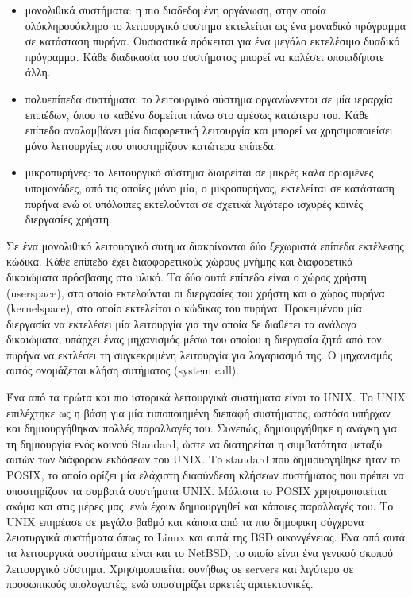 \begin{itemize}
	\item μονολιθικά συστήματα: η πιο διαδεδομένη οργάνωση, στην οποία
		ολόκληρουόκληρο το λειτουργικό συστημα εκτελείται ως ένα
		μοναδικό πρόγραμμα σε κατάσταση πυρήνα. Ουσιαστικά πρόκειται για
		ένα μεγάλο εκτελέσιμο δυαδικό πρόγραμμα. Κάθε διαδικασία του
		συστήματος μπορεί να καλέσει οποιαδήποτε άλλη. 
	\item πολυεπίπεδα συστήματα: το λειτουργικό σύστημα οργανώνενται σε μία
		ιεραρχία επιπέδων, όπου το καθένα δομείται πάνω στο αμέσως
		κατώτερο του. Κάθε επίπεδο αναλαμβάνει μία διαφορετική
		λειτουργία και μπορεί να χρησιμοποιείσει μόνο λειτουργίες που
		υποστηρίζουν κατώτερα επίπεδα.
	\item μικροπυρήνες: το λειτουργικό σύστημα διαιρείται σε μικρές καλά
		ορισμένες υπομονάδες, από τις οποίες μόνο μία, ο μικροπυρήνας,
		εκτελείται σε κατάσταση πυρήνα ενώ οι υπόλοιπες εκτελούνται σε
		σχετικά λιγότερο ισχυρές κοινές διεργασίες χρήστη.
\end{itemize}

Σε ένα μονολιθικό λειτουργικό συτημα διακρίνονται δύο ξεχωριστά επίπεδα
εκτέλεσης κώδικα. Κάθε επίπεδο έχει διαοφορετικούς χώρους μνήμης και διαφορετικά
δικαιώματα πρόσβασης στο υλικό. Τα δύο αυτά επίπεδα είναι ο χώρος χρήστη
(userspace), στο οποίο εκτελούνται οι διεργασίες του χρήστη και ο χώρος πυρήνα
(kernelspace), στο οποίο εκτελείται ο κώδικας του πυρήνα. Προκειμένου μία
διεργασία να εκτελέσει μία λειτουργία για την οποία δε διαθέτει τα ανάλογα
δικαιώματα, υπάρχει ένας μηχανισμός μέσω του οποίου η διεργασία ζητά από τον
πυρήνα να εκτλέσει τη συγκεκριμένη λειτουργία για λογαριασμό της. Ο μηχανισμός
αυτός ονομάζεται κλήση συτήματος (system call). 


Ένα από τα πρώτα και πιο ιστορικά λειτουργικά συστήματα είναι το UNIX. Το UNIX
επιλέχτηκε ως η βάση για μία τυποποιημένη διεπαφή συστήματος, ωστόσο υπήρχαν και
δημιουργήθηκαν πολλές παραλλαγές του. Συνεπώς, δημιουργήθηκε η ανάγκη για τη
δημιουργία ενός κοινού Standard, ώστε να διατηρείται η συμβατότητα μεταξύ αυτών
των διάφορων εκδόσεων του UNIX. Το standard που δημιουργήθηκε ήταν το POSIX, το
οποίο ορίζει μία ελάχιστη διασύνδεση κλήσεων συστήματος που πρέπει να
υποστηρίζουν τα συμβατά συστήματα UNIX. Μάλιστα το POSIX χρησιμοποιείται ακόμα
και στις μέρες μας, ενώ έχουν δημιουργηθεί και κάποιες παραλλαγές του. Το UNIX
επηρέασε σε μεγάλο βαθμό και κάποια από τα πιο δημοφικη σύγχρονα λειοτυργικά
συστήματα όπως το Linux και αυτά της BSD οικονγένειας. Ένα από αυτά τα
λειτουργικά συστήματα είναι και το NetBSD, το οποίο είναι ένα γενικού σκοπού
λειτουργικό σύστημα. Χρησιμοποιείται συνήθως σε servers και λιγότερο σε
προσωπικούς υπολογιστές, ενώ υποστηρίζει αρκετές αριτεκτονικές. 

